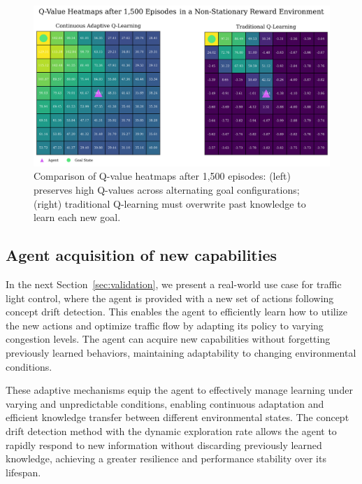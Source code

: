 \begin{figure}
    \centering
    \includegraphics[width=\textwidth]{figures/q_map_comp.png}
    \caption{Comparison of Q-value heatmaps after 1,500 episodes: (left) \adaptiverl preserves high Q-values across alternating goal configurations; (right) traditional Q-learning must overwrite past knowledge to learn each new goal.}
    \label{fig:q-value-comp}
\end{figure}

\subsection{Agent acquisition of new capabilities}
In the next Section~\ref{sec:validation}, we present a real-world use case for traffic light control, where the agent is provided with a new set of actions following concept drift detection. This enables the agent to efficiently learn how to utilize the new actions and optimize traffic flow by adapting its policy to varying congestion levels. The agent can acquire new capabilities without forgetting previously learned behaviors, maintaining adaptability to changing environmental conditions.

These adaptive mechanisms equip the agent to effectively manage learning under varying and unpredictable conditions, enabling continuous adaptation and efficient knowledge transfer between different environmental states. The concept drift detection method with the dynamic exploration rate allows the agent to rapidly respond to new information without discarding previously learned knowledge, achieving a greater resilience and performance stability over its lifespan. 

\endinput

